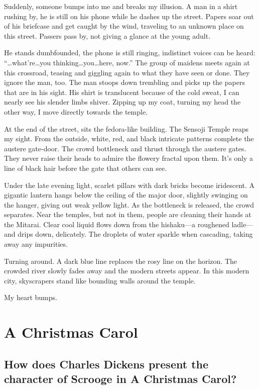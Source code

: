 \documentclass[11pt, oneside]{article}   	%
\begin{document}
Suddenly, someone bumps into me and breaks my illusion. A man in a shirt rushing by, he is still on his phone while he dashes up the street. Papers soar out of his briefcase and get caught by the wind, traveling to an unknown place on this street. Passers pass by, not giving a glance at the young adult. 

He stands dumbfounded, the phone is still ringing, indistinct voices can be heard: “…what’re…you thinking…you…here, now.” The group of maidens meets again at this crossroad, teasing and giggling again to what they have seen or done. They ignore the man, too. The man stoops down trembling and picks up the papers that are in his sight. His shirt is translucent because of the cold sweat, I can nearly see his slender limbs shiver. Zipping up my coat, turning my head the other way, I move directly towards the temple.  

At the end of the street, sits the fedora-like building. The Sensoji Temple reaps my sight. From the outside, white, red, and black intricate patterns complete the austere gate-door. The crowd bottleneck and thrust through the austere gates. They never raise their heads to admire the flowery fractal upon them. It’s only a line of black hair before the gate that others can see. 

Under the late evening light, scarlet pillars with dark bricks become iridescent. A gigantic lantern hangs below the ceiling of the major door, slightly swinging on the hanger, giving out weak yellow light. As the bottleneck is released, the crowd separates. Near the temples, but not in them, people are cleaning their hands at the Mitarai. Clear cool liquid flows down from the hishaku—a roughened ladle—and drips down, delicately. The droplets of water sparkle when cascading, taking away any impurities. 
  
Turning around. A dark blue line replaces the rosy line on the horizon. The crowded river slowly fades away and the modern streets appear. In this modern city, skyscrapers stand like bounding walls around the temple. 
  
My heart bumps.  

\newpage
\section{A Christmas Carol}
\subsection{How does Charles Dickens present the character of Scrooge in A Christmas Carol? }
\end{document}
